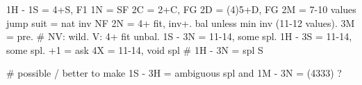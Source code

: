 1H - 1S = 4+S, F1
1N = SF
2C = 2+C, FG
2D = (4)5+D, FG
2M = 7-10 values
jump suit = nat inv NF
2N = 4+ fit, inv+. bal unless min inv (11-12 values).
3M = pre.  # NV: wild. V: 4+ fit unbal.
1S - 3N = 11-14, some spl. 1H - 3S = 11-14, some spl.
     +1 = ask
4X = 11-14, void spl  # 1H - 3N = spl S

# possible / better to make 1S - 3H = ambiguous spl and 1M - 3N = (4333) ?